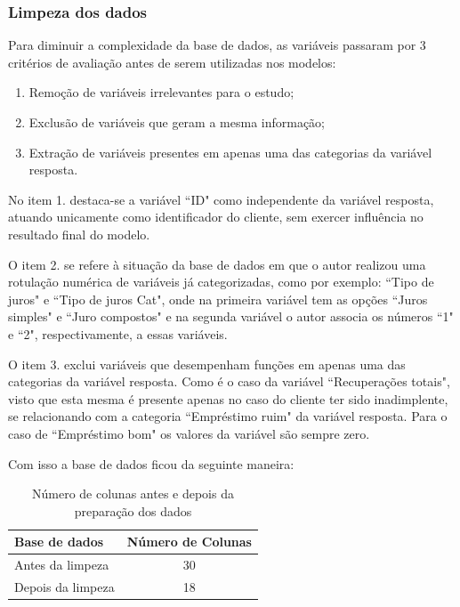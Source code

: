 \subsubsection{Limpeza dos dados}

Para diminuir a complexidade da base de dados, as variáveis passaram por 3 critérios de avaliação antes de serem utilizadas
nos modelos:

\begin{enumerate}
  \item Remoção de variáveis irrelevantes para o estudo;
  \item Exclusão de variáveis que geram a mesma informação;
  \item Extração de variáveis presentes em apenas uma das categorias da variável resposta.
\end{enumerate}

No item 1. destaca-se a variável ``ID" como independente da variável resposta, 
atuando unicamente como identificador do cliente, sem exercer influência no resultado final do modelo.

O item 2. se refere à situação da base de dados em que o autor realizou uma rotulação numérica de variáveis 
já categorizadas, como por exemplo: 
``Tipo de juros" e ``Tipo de juros Cat", onde na primeira variável tem as opções ``Juros simples" e ``Juro compostos" e na segunda variável
o autor associa os números ``1" e ``2", respectivamente, a essas variáveis.

O item 3. exclui variáveis que desempenham funções em apenas uma das categorias da variável resposta. Como é o caso da 
variável ``Recuperações totais", visto que esta mesma é presente apenas no caso do cliente ter sido inadimplente, se relacionando
com a categoria ``Empréstimo ruim" da variável resposta. Para o caso de ``Empréstimo bom" os valores da variável são sempre zero.

Com isso a base de dados ficou da seguinte maneira:

\begin{table}[h]
  \centering
  \begin{tabular}{l|c}
  \hline
  \textbf{Base de dados} & \textbf{Número de Colunas} \\ \hline
  Antes da limpeza & 30 \\ 
  Depois da limpeza & 18 \\ \hline
  \end{tabular}
  \caption{Número de colunas antes e depois da preparação dos dados}
  \label{table:columns_before_after}
\end{table}

